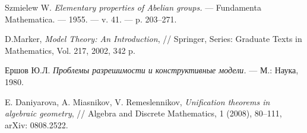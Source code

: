 \documentclass[a4paper,11pt,twoside]{article}
\begin{document}
\begin{thebibliography}{}

 Szmielew W. \textit{Elementary properties of Abelian groups.} — Fundamenta Mathematica. —
1955. — v. 41. — p. 203–271.

 D.Marker, \textit{Model Theory: An Introduction}, // Springer, Series: Graduate Texts in Mathematics, Vol. 217, 2002, 342 p.

 Ершов Ю.Л. \textit{Проблемы разрешимости и конструктивные модели.} --- М.: Наука, 1980.

 E. Daniyarova, A. Miasnikov, V. Remeslennikov, \textit{Unification theorems in algebraic geometry}, // Algebra and Discrete Mathematics, 1 (2008), 80--111, arXiv: 0808.2522.


\end{thebibliography}
\end{document}
